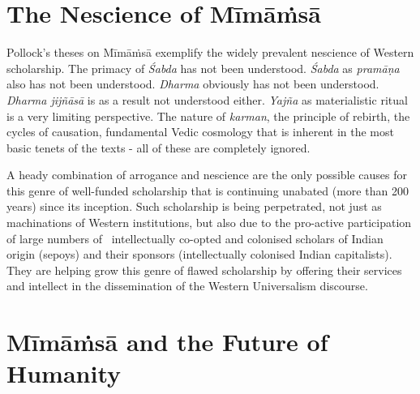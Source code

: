 \section*{The Nescience of Mīmāṁsā}

\vspace{-.1cm}

Pollock’s theses on Mīmāṁsā exemplify the widely prevalent nescience of Western scholarship. The primacy of \textit{Śabda} has not been understood. \textit{Śabda} as \textit{pramāṇa} also has not been understood. \textit{Dharma} obviously has not been understood. \textit{Dharma jijñāsā} is as a result not understood either. \textit{Yajña} as materialistic ritual is a very limiting perspective. The nature of \textit{karman}, the principle of rebirth, the cycles of causation, fundamental Vedic cosmology that is inherent in the most basic tenets of the texts - all of these are completely ignored.

A heady combination of arrogance and nescience are the only possible causes for this genre of well-funded scholarship that is continuing unabated (more than 200 years) since its inception. Such scholarship is being perpetrated, not just as machinations of Western institutions, but also due to the pro-active participation of large numbers of  intellectually co-opted and colonised scholars of Indian origin (sepoys) and their sponsors (intellectually colonised Indian capitalists). They are helping grow this genre of flawed scholarship by offering their services and intellect in the dissemination of the Western Universalism discourse.

\vspace{-.3cm}

\section*{Mīmāṁsā and the Future of Humanity}

